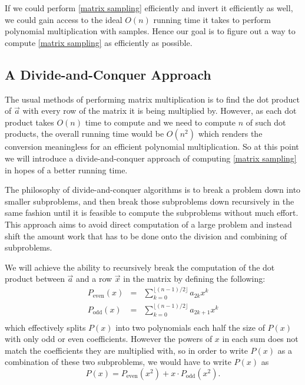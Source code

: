 \documentclass[12pt]{article}
\begin{document}
If we could perform \eqref{matrix sampling} efficiently and invert it efficiently as well, we could gain access to the ideal $O(n)$ running time it takes to perform polynomial multiplication with samples. Hence our goal is to figure out a way to compute \eqref{matrix sampling} as efficiently as possible.

\subsection{A Divide-and-Conquer Approach}
The usual methods of performing matrix multiplication is to find the dot product of $\vec{a}$ with every row of the matrix it is being multiplied by. However, as each dot product takes $O(n)$ time to compute and we need to compute $n$ of such dot products, the overall running time would be $O(n^2)$ which renders the conversion meaningless for an efficient polynomial multiplication. So at this point we will introduce a divide-and-conquer approach of computing \eqref{matrix sampling} in hopes of a better running time.

The philosophy of divide-and-conquer algorithms is to break a problem down into smaller subproblems, and then break those subproblems down recursively in the same fashion until it is feasible to compute the subproblems without much effort. This approach aims to avoid direct computation of a large problem and instead shift the amount work that has to be done onto the division and combining of subproblems. 

We will achieve the ability to recursively break the computation of the dot product between $\vec{a}$ and a row $\vec{x}$ in the matrix by defining the following:
\begin{eqnarray*}
P_{\text{even}}(x)&=&\displaystyle \sum_{k=0}^{\lfloor(n-1)/2\rfloor} a_{2k}x^k\\
P_{\text{odd}}(x)&=&\displaystyle \sum_{k=0}^{\lfloor(n-1)/2\rfloor} a_{2k+1}x^k\\
\end{eqnarray*}
which effectively splits $P(x)$ into two polynomials each half the size of $P(x)$ with only odd or even coefficients. However the powers of $x$ in each sum does not match the coefficients they are multiplied with, so in order to write $P(x)$ as a combination of these two subproblems, we would have to write $P(x)$ as
\begin{equation}\label{split}
P(x) = P_{\text{even}}(x^2)+x\cdot P_{\text{odd}}(x^2).
\end{equation}
\end{document}
